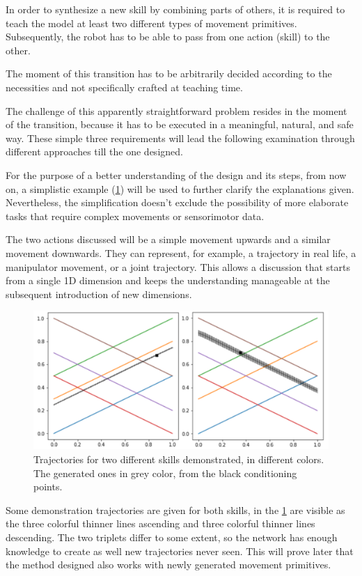 In order to synthesize a new skill by combining parts of others, it is required to teach the model at least two different types of movement primitives. Subsequently, the robot has to be able to pass from one action (skill) to the other. 

The moment of this transition has to be arbitrarily decided according to the necessities and not specifically crafted at teaching time. 

The challenge of this apparently straightforward problem resides in the moment of the transition, because it has to be executed in a meaningful, natural, and safe way. These simple three requirements will lead the following examination through different approaches till the one designed. 

For the purpose of a better understanding of the design and its steps, from now on, a simplistic example (\cref{fig:trajX}) will be used to further clarify the explanations given. Nevertheless, the simplification doesn't exclude the possibility of more elaborate tasks that require complex movements or sensorimotor data. 

The two actions discussed will be a simple movement upwards and a similar movement downwards. They can represent, for example, a trajectory in real life, a manipulator movement, or a joint trajectory. This allows a discussion that starts from a single 1D dimension and keeps the understanding manageable at the subsequent introduction of new dimensions. 

\begin{figure}
    \centering
    \includegraphics[width=0.8\linewidth]{figures/trajX.png}
    \caption{ Trajectories for two different skills demonstrated, in different colors. The generated ones in grey color, from the black conditioning points. }
    \label{fig:trajX}
\end{figure}

Some demonstration trajectories are given for both skills, in the \cref{fig:trajX} are visible as the three colorful thinner lines ascending and three colorful thinner lines descending. The two triplets differ to some extent, so the network has enough knowledge to create as well new trajectories never seen. This will prove later that the method designed also works with newly generated movement primitives. 

